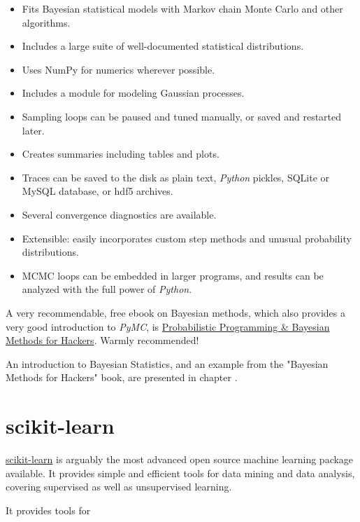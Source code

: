 \begin{itemize}
    \item Fits Bayesian statistical models with Markov chain Monte Carlo and other algorithms.
    \item Includes a large suite of well-documented statistical distributions.
    \item Uses NumPy for numerics wherever possible.
    \item Includes a module for modeling Gaussian processes.
    \item Sampling loops can be paused and tuned manually, or saved and restarted later.
    \item Creates summaries including tables and plots.
    \item Traces can be saved to the disk as plain text, \emph{Python} pickles, SQLite or MySQL database, or hdf5 archives.
    \item Several convergence diagnostics are available.
    \item Extensible: easily incorporates custom step methods and unusual probability distributions.
    \item MCMC loops can be embedded in larger programs, and results can be analyzed with the full power of \emph{Python}.
\end{itemize}

A very recommendable, free ebook on Bayesian methods, which also provides a very good introduction to \emph{PyMC}, is \href{http://camdavidsonpilon.github.io/Probabilistic-Programming-and-Bayesian-Methods-for-Hackers/}{
Probabilistic Programming \& Bayesian Methods for Hackers}. Warmly recommended!

An introduction to Bayesian Statistics, and an example from the "Bayesian Methods for Hackers" book, are presented in chapter .

\section{scikit-learn}

\href{scikit-learn.org}{scikit-learn} is arguably the most advanced open source machine learning package available. It provides simple and efficient tools for data mining and data analysis, covering supervised as well as unsupervised learning.

It provides tools for

